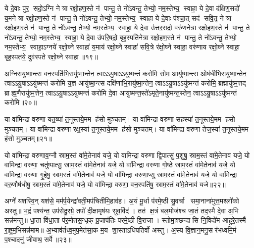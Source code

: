 ये दे॒वाः पु॑र॒ सदो॒ऽग्नि नेत्रा रक्षो॒हण॒स्ते न॑ पान्तु॒
ते नो॑ऽवन्तु॒  तेभ्यो॒ नम॒स्तेभ्य॒ स्वाहा॒
ये दे॒वा द॑क्षिण॒सदो॑ य॒मनेत्रा रक्षो॒हण॒स्ते न॑ पान्तु॒
ते नो॑ऽवन्तु॒  तेभ्यो॒ नम॒स्तेभ्य॒ स्वाहा॒
ये दे॒वाः प॑श्चा॒त् सद॑ सवि॒तृ नेत्रा रक्षो॒हण॒स्ते न॑ पान्तु॒
ते नो॑ऽवन्तु॒  तेभ्यो॒ नम॒स्तेभ्य॒ स्वाहा॒
ये दे॒वा उ॑त्तर॒सदो॒ वरु॑णनेत्रा रक्षो॒हण॒स्ते न॑ पान्तु॒
ते नो॑ऽवन्तु॒  तेभ्यो॒ नम॒स्तेभ्य॒ स्वाहा॒
ये दे॒वा उ॑परि॒षदो॒ बृह॒स्पति॑नेत्रा रक्षो॒हण॒स्ते न॑ पान्तु॒
ते नो॑ऽवन्तु॒  तेभ्यो॒ नम॒स्तेभ्य॒ स्वाहा॒ऽग्नये॑ रक्षो॒घ्ने स्वाहा॑ य॒माय॑ रक्षो॒घ्ने स्वाहा॑
सवि॒त्रे र॑क्षो॒घ्ने स्वाहा॒ वरु॑णाय रक्षो॒घ्ने स्वाहा॒ बृह॒स्पत॑ये॒ दुव॑स्पते रक्षो॒घ्ने स्वाहा॥१९॥

अ॒ग्निरायु॑ष्मा॒न्त्स वन॒स्पति॑भि॒रायु॑ष्मा॒न्तेन॒ त्वाऽऽयु॒षा\-ऽऽयु॑ष्मन्तं करोमि॒
सोम॒ आयु॑ष्मा॒न्त्स ओष॑धीभि॒रायु॑ष्मा॒न्तेन॒ त्वाऽऽयु॒षा\-ऽऽयु॑ष्मन्तं करोमि
य॒ज्ञ आयु॑ष्मा॒न्त्स दक्षि॑णाभि॒रायु॑ष्मा॒न्तेन॒ त्वाऽऽयु॒षा\-ऽऽयु॑ष्मन्तं करोमि॒
ब्रह्मायु॑ष्म॒त्तद् ब्राह्म॒णैरायु॑ष्म॒त्तेन॒ त्वाऽऽयु॒षा\-ऽऽयु॑ष्मन्तं करोमि
दे॒वा आयु॑ष्मन्त॒स्ते॑ऽमृते॒नायु॑ष्मन्त॒स्तेन॒ त्वा\-ऽऽयु॒षाऽऽयु॑ष्मन्तं करोमि॥२०॥

या वा॑मिन्द्रा वरुणा यत॒व्या॑ त॒नूस्तये॒मम ह॑सो मुञ्चतम्।
या वा॑मिन्द्रा वरुणा सह॒स्या॑ त॒नूस्तये॒मम ह॑सो मुञ्चतम्।
या वा॑मिन्द्रा वरुणा रक्ष॒स्या॑ त॒नूस्तये॒मम ह॑सो मुञ्चतम्।
या वा॑मिन्द्रा वरुणा तेज॒स्या॑ त॒नूस्तये॒मम ह॑सो मुञ्चतम्॥२१॥

यो वा॑मिन्द्रा वरुणाव॒ग्नौ स्राम॒स्तं वा॑मे॒तेनाव॑ यजे॒
यो वा॑मिन्द्रा वरुणा द्वि॒पात्सु॑ प॒शुषु॒ स्राम॒स्तं वा॑मे॒तेनाव॑ यजे॒
यो वा॑मिन्द्रा वरुणा॒ चतु॑ष्पात्सु॒ स्राम॒स्तं वा॑मे॒तेनाव॑ यजे॒
यो वा॑मिन्द्रा वरुणा गो॒ष्ठे स्राम॒स्तं वा॑मे॒तेनाव॑ यजे॒
यो वा॑मिन्द्रा वरुणा गृ॒हेषु॒ स्राम॒स्तं वा॑मे॒तेनाव॑ यजे॒
यो वा॑मिन्द्रा वरुणा॒प्सु स्राम॒स्तं वा॑मे॒तेनाव॑ यजे॒
यो वा॑मिन्द्रा वरु॒णौष॑धीषु॒ स्राम॒स्तं वा॑मे॒तेनाव॑ यजे॒
यो वा॑मिन्द्रा वरुणा॒ वन॒स्पति॑षु॒ स्राम॒स्तं वा॑मे॒तेनाव॑ यजे॥२२॥

अग्ने॑ यशस्वि॒न् यश॑से॒ मम॑र्प॒येन्द्रा॑वती॒मप॑चितीमि॒हाव॑ह।
अ॒यं मू॒र्धा प॑रमे॒ष्ठी सु॒वर्चा समा॒नाना॑मुत्त॒मश्लो॑को अस्तु॥
भ॒द्रं पश्य॑न्त॒ उप॑सेदु॒रग्रे॒ तपो॑ दी॒क्षामृष॑यः सुव॒र्विद॑।
तत॑ क्ष॒त्रं बल॒मोज॑श्च जा॒तं तद॒स्मै दे॒वा अ॒भि सन्न॑मन्तु॥
धा॒ता वि॑धा॒ता प॑र॒मोतस॒न्धृक् प्र॒जाप॑तिः परमे॒ष्ठी वि॒राजा।
स्तोमा॒श्छन्दासि नि॒विदो॑म आहुरे॒तस्मै॑ रा॒ष्ट्रम॒भिसन्न॑माम॥
अ॒भ्याव॑र्तध्व॒मुप॒मेत॑सा॒क म॒य शा॒स्ताऽधि॑पतिर्वो अस्तु।
अ॒स्य वि॒ज्ञान॒मनु॒सर॑भध्वमि॒मं प॒श्चादनु॑ जीवाथ॒ सर्वे॥२३॥


